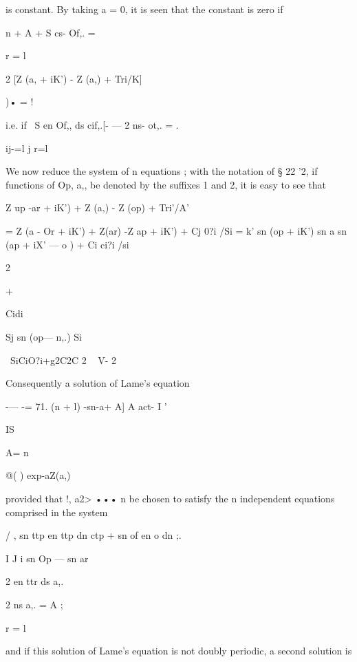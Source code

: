 {{{{{{{{is constant. By taking a = 0, it is seen that the constant is zero if



n + A + S cs- Of,. =

r = l



2 [Z (a, + iK') - Z (a,) + Tri/K]

)• = !



i.e. if \ S en Of,, ds cif,.[- — 2 ns- ot,. = .

ij-=l j r=l

We now reduce the system of n equations ; with the notation of § 22
'2, if functions of Op, a,, be denoted by the suffixes 1 and 2, it is
easy to see that

Z up -ar + iK') + Z (a,) - Z (op) + Tri'/A'

= Z (a - Or + iK') + Z(ar) -Z ap + iK') + Cj 0?i /Si = k' sn (op +
iK') sn a sn (ap + iX' — o ) + Ci ci?i /si



 2



+



Cidi



Sj sn (op— n,.) Si

\ SiCiO?i+g2C2C 2 ~ V- 2

Consequently a solution of Lame's equation

-— -= 71. (n + l) -sn-a+ A] A act- I '



IS



A= n



@( ) exp-aZ(a,)



provided that !, a2> ••• n be chosen to satisfy the n independent
equations comprised in the system

/ , sn ttp en ttp dn ctp + sn of en o dn ;. \

I J i sn Op — sn ar



2 en ttr ds a,.



2 ns a,. = A ;

r = l



and if this solution of Lame's equation is not doubly periodic, a
second solution is

}}}}}}}}
